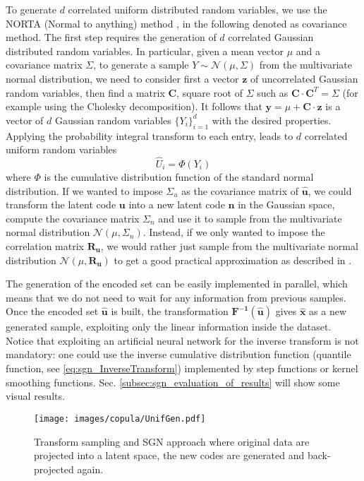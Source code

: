 To generate $d$ correlated uniform distributed random variables, we use the NORTA (Normal to anything) method \cite{NORTA}, in the following denoted as covariance method. 
The first step requires the generation of $d$ correlated Gaussian distributed random variables. In particular, given a mean vector $\mu$ and a covariance matrix $\Sigma$, to generate a sample $Y\sim \mathcal{N}(\mu,\Sigma)$ from the multivariate normal distribution, we need to consider first a vector $\mathbf{z}$ of uncorrelated Gaussian random variables, then find a matrix $\mathbf{C}$, square root of $\Sigma$ such as $\mathbf{C}\cdot \mathbf{C}^T = \Sigma$ (for example using the Cholesky decomposition). It follows that $\mathbf{y}=\mu + \mathbf{C}\cdot \mathbf{z}$ is a vector of $d$ Gaussian random variables $\{Y_i\}_{i=1}^d$ with the desired properties. Applying the probability integral transform to each entry, leads to $d$ correlated uniform random variables 
\begin{equation}
\hat{U}_i = \Phi(Y_i)
\label{eq:sgn_ProbabilityIntegralTransform}
\end{equation}
where $\Phi$ is the cumulative distribution function of the standard normal distribution.
If we wanted to impose $\Sigma_u$ as the covariance matrix of $\mathbf{\hat{u}}$, we could transform the latent code $\mathbf{u}$ into a new latent code $\mathbf{n}$ in the Gaussian space, compute the covariance matrix $\Sigma_n$ and use it to sample from the multivariate normal distribution $\mathcal{N}(\mu,\Sigma_n)$. Instead, if we only wanted to impose the correlation matrix $\mathbf{R_u}$, we would rather just sample from the multivariate normal distribution $\mathcal{N}(\mu,\mathbf{R_u})$ to get a good practical approximation as described in \cite{Falk1999}.

The generation of the encoded set can be easily implemented in parallel, which means that we do not need to wait for any information from previous samples. Once the encoded set $\mathbf{\hat{u}}$ is built, the transformation $\mathbf{F^{-1}}(\mathbf{\hat{u}})$ gives $\mathbf{\hat{x}}$ as a new generated sample, exploiting only the linear information inside the dataset. Notice that exploiting an artificial neural network for the inverse transform is not mandatory: one could use the inverse cumulative distribution function (quantile function, see \eqref{eq:sgn_InverseTransform}) implemented by step functions or kernel smoothing functions.
Sec. \ref{subsec:sgn_evaluation_of_results} will show some visual results.

\begin{figure}
\centering
\texttt{[image: images/copula/UnifGen.pdf]}
\caption{Transform sampling and SGN approach where original data are projected into a latent space, the new codes are generated and back-projected again.}
\label{fig:sgn_OurFramework}
\end{figure}


